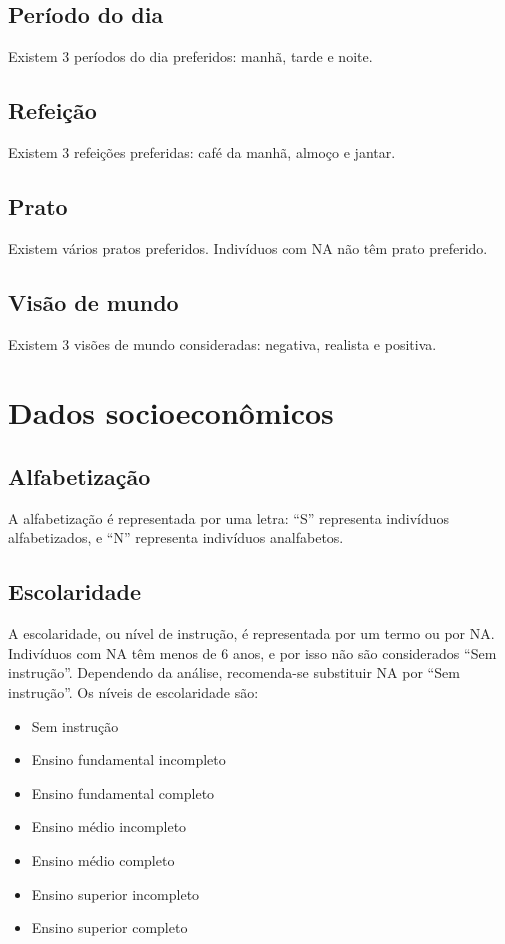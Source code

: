 \documentclass{book}
\begin{document}
\subsection{Período do dia}
Existem 3 períodos do dia preferidos: manhã, tarde e noite.

\subsection{Refeição}
Existem 3 refeições preferidas: café da manhã, almoço e jantar.

\subsection{Prato}
Existem vários pratos preferidos. Indivíduos com NA não têm prato preferido.

\subsection{Visão de mundo}
Existem 3 visões de mundo consideradas: negativa, realista e positiva.

\section{Dados socioeconômicos}

\subsection{Alfabetização}
A alfabetização é representada por uma letra: ``S'' representa indivíduos alfabetizados, e ``N'' representa indivíduos analfabetos.

\subsection{Escolaridade}
A escolaridade, ou nível de instrução, é representada por um termo ou por NA. Indivíduos com NA têm menos de 6 anos, e por isso não são considerados ``Sem instrução''. Dependendo da análise, recomenda-se substituir NA por ``Sem instrução''. Os níveis de escolaridade são:
\begin{itemize}
  \item Sem instrução
  \item Ensino fundamental incompleto
  \item Ensino fundamental completo
  \item Ensino médio incompleto
  \item Ensino médio completo
  \item Ensino superior incompleto
  \item Ensino superior completo
\end{itemize}
\end{document}
